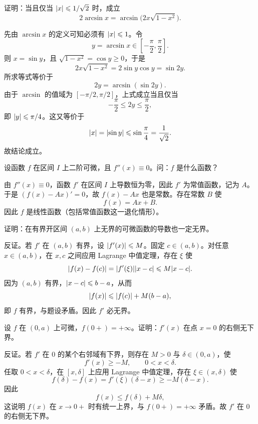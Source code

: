 \begin{xexercise}[12]
证明：当且仅当 $\lvert x\rvert\leqslant1/\sqrt2$ 时，成立
\[
  2\arcsin x=\arcsin\bigl(2x\sqrt{1-x^2}\bigr).
\]
\end{xexercise}
\begin{xsolution}
先由 $\arcsin x$ 的定义可知必须有 $\lvert x\rvert\leqslant1$。令
\[
  y=\arcsin x\in\left[-\frac\pi2,\frac\pi2\right].
\]
则 $x=\sin y$，且 $\sqrt{1-x^2}=\cos y\geqslant0$，于是
\[
  2x\sqrt{1-x^2}=2\sin y\cos y=\sin2y.
\]
所求等式等价于
\[
  2y=\arcsin(\sin2y).
\]
由于 $\arcsin$ 的值域为 $[-\pi/2,\pi/2]$，上式成立当且仅当
\[
  -\frac\pi2\leqslant2y\leqslant\frac\pi2,
\]
即 $\lvert y\rvert\leqslant\pi/4$。这又等价于
\[
  \lvert x\rvert=\lvert\sin y\rvert\leqslant\sin\frac\pi4=\frac1{\sqrt2}.
\]
故结论成立。
\end{xsolution}


\begin{xexercise}[13]
设函数 $f$ 在区间 $I$ 上二阶可微，且 $f''(x)\equiv0$。问：$f$ 是什么函数？
\end{xexercise}
\begin{xsolution}
由 $f''(x)\equiv0$，函数 $f'$ 在区间 $I$ 上导数恒为零，因此 $f'$ 为常值函数，记为 $A$。于是 $(f(x)-Ax)'=0$，故 $f(x)-Ax$ 也是常数。存在常数 $B$ 使
\[
  f(x)=Ax+B.
\]
因此 $f$ 是线性函数（包括常值函数这一退化情形）。
\end{xsolution}


\begin{xexercise}[14]
证明：在有界开区间 $(a,b)$ 上无界的可微函数的导数也一定无界。
\end{xexercise}
\begin{xsolution}
反证。若 $f'$ 在 $(a,b)$ 有界，设 $\lvert f'(x)\rvert\leqslant M$。固定 $c\in(a,b)$。对任意 $x\in(a,b)$，在 $x,c$ 之间应用 Lagrange 中值定理，存在 $\xi$ 使
\[
  \lvert f(x)-f(c)\rvert=\lvert f'(\xi)\rvert\lvert x-c\rvert
  \leqslant M\lvert x-c\rvert.
\]
因为 $(a,b)$ 有界，$\lvert x-c\rvert\leqslant b-a$，从而
\[
  \lvert f(x)\rvert\leqslant\lvert f(c)\rvert+M(b-a),
\]
即 $f$ 有界，与题设矛盾。因此 $f'$ 必无界。
\end{xsolution}


\begin{xexercise}[15]
设 $f$ 在 $(0,a)$ 上可微，$f(0+)=+\infty$。证明：$f'(x)$ 在点 $x=0$ 的右侧无下界。
\end{xexercise}
\begin{xsolution}
反证。若 $f'$ 在 $0$ 的某个右邻域有下界，则存在 $M>0$ 与 $\delta\in(0,a)$，使
\[
  f'(x)\geqslant-M,
  \qquad0<x<\delta.
\]
任取 $0<x<\delta$，在 $[x,\delta]$ 上应用 Lagrange 中值定理，存在 $\xi\in(x,\delta)$ 使
\[
  f(\delta)-f(x)=f'(\xi)(\delta-x)\geqslant-M(\delta-x).
\]
因此
\[
  f(x)\leqslant f(\delta)+M\delta,
\]
这说明 $f(x)$ 在 $x\to0+$ 时有统一上界，与 $f(0+)=+\infty$ 矛盾。故 $f'$ 在 $0$ 的右侧无下界。
\end{xsolution}


